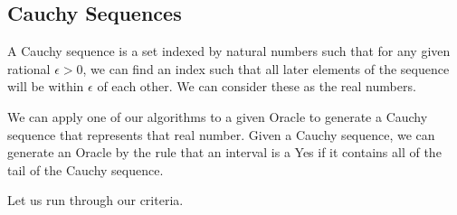 \documentclass[12pt]{article}
\theoremstyle{remark}
\begin{document}
\subsection{Cauchy Sequences}

A Cauchy sequence is a set indexed by natural numbers such that for any given rational $\epsilon > 0$, we can find an index such that all later elements of the sequence will be within $\epsilon$ of each other. We can consider these as the real numbers. 

We can apply one of our algorithms to a given Oracle to generate a Cauchy sequence that represents that real number. Given a Cauchy sequence, we can generate an Oracle by the rule that an interval is a Yes if it contains all of the tail of the Cauchy sequence. 

Let us run through our criteria. 
\end{document}
